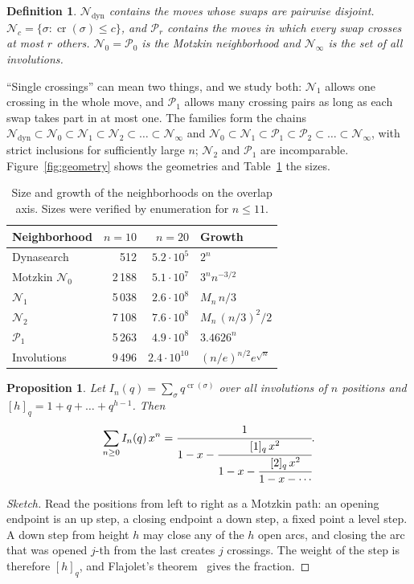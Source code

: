 \documentclass{article}
\newtheorem{proposition}{Proposition}
\newtheorem{definition}{Definition}
\newcommand{\N}{\mathcal{N}}
\newcommand{\Pa}{\mathcal{P}}
\newcommand{\ncr}{\operatorname{cr}}
\begin{document}
\begin{definition}
$\N_{\mathrm{dyn}}$ contains the moves whose swaps are pairwise
disjoint. $\N_c=\{\sigma:\ncr(\sigma)\leq c\}$, and $\Pa_r$ contains the
moves in which every swap crosses at most $r$ others. $\N_0=\Pa_0$ is
the Motzkin neighborhood and $\N_\infty$ is the set of all involutions.
\end{definition}

``Single crossings'' can mean two things, and we study both: $\N_1$
allows one crossing in the whole move, and $\Pa_1$ allows many crossing
pairs as long as each swap takes part in at most one. The families form
the chains
$\N_{\mathrm{dyn}}\subset\N_0\subset\N_1\subset\N_2\subset\dots\subset\N_\infty$
and $\N_0\subset\N_1\subset\Pa_1\subset\Pa_2\subset\dots\subset\N_\infty$,
with strict inclusions for sufficiently large $n$; $\N_2$ and $\Pa_1$
are incomparable. Figure~\ref{fig:geometry} shows the geometries and
Table~\ref{tab:taxonomy} the sizes.

\begin{table}[t]
\centering
\caption{Size and growth of the neighborhoods on the overlap axis.
Sizes were verified by enumeration for $n\leq 11$.}
\label{tab:taxonomy}
\small
\begin{tabular}{@{}lrrl@{}}
\toprule
Neighborhood & $n=10$ & $n=20$ & Growth \\
\midrule
Dynasearch & 512 & $5.2{\cdot}10^5$ & $2^n$ \\
Motzkin $\N_0$ & 2\,188 & $5.1{\cdot}10^7$ & $3^n n^{-3/2}$ \\
$\N_1$ & 5\,038 & $2.6{\cdot}10^8$ & $M_n\,n/3$ \\
$\N_2$ & 7\,108 & $7.6{\cdot}10^8$ & $M_n\,(n/3)^2/2$ \\
$\Pa_1$ & 5\,263 & $4.9{\cdot}10^8$ & $3.4626^n$ \\
Involutions & 9\,496 & $2.4{\cdot}10^{10}$ & $(n/e)^{n/2}e^{\sqrt n}$ \\
\bottomrule
\end{tabular}
\end{table}

\begin{proposition}\label{prop:jfrac}
Let $I_n(q)=\sum_{\sigma}q^{\ncr(\sigma)}$ over all involutions of $n$
positions and $[h]_q=1+q+\dots+q^{h-1}$. Then
\begin{equation}
\sum_{n\geq0} I_n(q)\,x^n=
\cfrac{1}{1-x-\cfrac{[1]_q\,x^2}{1-x-\cfrac{[2]_q\,x^2}{1-x-\cdots}}}.
\end{equation}
\end{proposition}
\begin{proof}[Sketch]
Read the positions from left to right as a Motzkin path: an opening
endpoint is an up step, a closing endpoint a down step, a fixed point a
level step. A down step from height $h$ may close any of the $h$ open
arcs, and closing the arc that was opened $j$-th from the last creates
$j$ crossings. The weight of the step is therefore $[h]_q$, and
Flajolet's theorem~\cite{flajolet1980} gives the fraction.
\end{proof}
\end{document}
